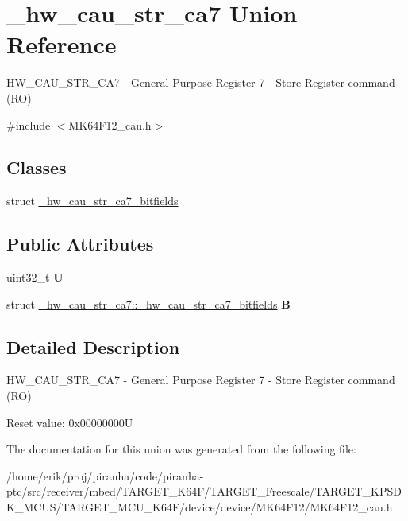 \hypertarget{union__hw__cau__str__ca7}{}\section{\+\_\+hw\+\_\+cau\+\_\+str\+\_\+ca7 Union Reference}
\label{union__hw__cau__str__ca7}


H\+W\+\_\+\+C\+A\+U\+\_\+\+S\+T\+R\+\_\+\+C\+A7 -\/ General Purpose Register 7 -\/ Store Register command (RO)  




{\ttfamily \#include $<$M\+K64\+F12\+\_\+cau.\+h$>$}

\subsection*{Classes}
\begin{DoxyCompactItemize}
\item 
struct \hyperlink{struct__hw__cau__str__ca7_1_1__hw__cau__str__ca7__bitfields}{\+\_\+hw\+\_\+cau\+\_\+str\+\_\+ca7\+\_\+bitfields}
\end{DoxyCompactItemize}
\subsection*{Public Attributes}
\begin{DoxyCompactItemize}
\item 
uint32\+\_\+t {\bfseries U}\hypertarget{union__hw__cau__str__ca7_a5c128116db09a850cc1a294b68cee2a9}{}\label{union__hw__cau__str__ca7_a5c128116db09a850cc1a294b68cee2a9}

\item 
struct \hyperlink{struct__hw__cau__str__ca7_1_1__hw__cau__str__ca7__bitfields}{\+\_\+hw\+\_\+cau\+\_\+str\+\_\+ca7\+::\+\_\+hw\+\_\+cau\+\_\+str\+\_\+ca7\+\_\+bitfields} {\bfseries B}\hypertarget{union__hw__cau__str__ca7_ad70a044e82a21fc0b714405ac734db36}{}\label{union__hw__cau__str__ca7_ad70a044e82a21fc0b714405ac734db36}

\end{DoxyCompactItemize}


\subsection{Detailed Description}
H\+W\+\_\+\+C\+A\+U\+\_\+\+S\+T\+R\+\_\+\+C\+A7 -\/ General Purpose Register 7 -\/ Store Register command (RO) 

Reset value\+: 0x00000000U 

The documentation for this union was generated from the following file\+:\begin{DoxyCompactItemize}
\item 
/home/erik/proj/piranha/code/piranha-\/ptc/src/receiver/mbed/\+T\+A\+R\+G\+E\+T\+\_\+\+K64\+F/\+T\+A\+R\+G\+E\+T\+\_\+\+Freescale/\+T\+A\+R\+G\+E\+T\+\_\+\+K\+P\+S\+D\+K\+\_\+\+M\+C\+U\+S/\+T\+A\+R\+G\+E\+T\+\_\+\+M\+C\+U\+\_\+\+K64\+F/device/device/\+M\+K64\+F12/M\+K64\+F12\+\_\+cau.\+h\end{DoxyCompactItemize}
